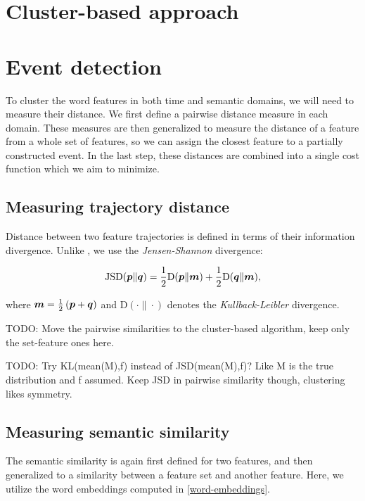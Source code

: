 \section{Cluster-based approach}


\section{Event detection}
To cluster the word features in both time and semantic domains, we will need to measure their distance. We first define a pairwise distance measure in each domain. These measures are then generalized to measure the distance of a feature from a whole set of features, so we can assign the closest feature to a partially constructed event. In the last step, these distances are combined into a single cost function which we aim to minimize.


\subsection{Measuring trajectory distance}

Distance between two feature trajectories is defined in terms of their information divergence. Unlike \cite{event-detection}, we use the \textit{Jensen-Shannon} divergence:

\begin{equation*}
	\featsim( \vect{p} \| \vect{q} ) = \frac{1}{2} \text{D}( \vect{p} \| \vect{m} ) + \frac{1}{2} \text{D}( \vect{q} \| \vect{m} ),
\end{equation*}

where $\vect{m} = \frac{1}{2} \left( \vect{p} + \vect{q} \right)$ and $\text{D}( \cdot \| \cdot )$ denotes the \textit{Kullback-Leibler} divergence.



{\color{red} TODO: Move the pairwise similarities to the cluster-based algorithm, keep only the set-feature ones here.}

{\color{blue} TODO: Try KL(mean(M),f) instead of JSD(mean(M),f)? Like M is the true distribution and f assumed. Keep JSD in pairwise similarity though, clustering likes symmetry.}


\subsection{Measuring semantic similarity}

The semantic similarity is again first defined for two features, and then generalized to a similarity between a feature set and another feature. Here, we utilize the word embeddings computed in \ref{word-embeddings}.

